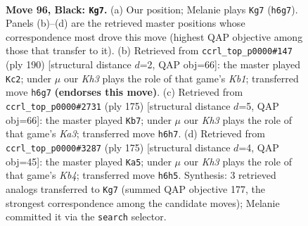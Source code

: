 \documentclass[11pt]{article}
\begin{document}
\clearpage

\begin{figure}[p]\centering
\begin{subfigure}{0.46\textwidth}\centering
\resizebox{\linewidth}{!}{%
\newchessgame
\chessboard[
  setfen={8/8/1R5k/8/8/7K/5p2/3r4 b - - 7 96},
  showmover=false,
  pgfstyle=straightmove, color=movearrow, markmove={h6-g7}
]}
\caption{}
\end{subfigure}\hfill
\begin{subfigure}{0.46\textwidth}\centering
\resizebox{\linewidth}{!}{%
\newchessgame
\chessboard[
  setfen={1k6/8/8/8/8/2R5/8/1K5r w - - 22 96},
  showmover=false,
  pgfstyle=straightmove, color=movearrow, markmove={b1-c2}
]}
\caption{}
\end{subfigure}
\\[4pt]
\begin{subfigure}{0.46\textwidth}\centering
\resizebox{\linewidth}{!}{%
\newchessgame
\chessboard[
  setfen={8/8/k5R1/7p/1K5P/8/8/4r3 b - - 14 88},
  showmover=false,
  pgfstyle=straightmove, color=movearrow, markmove={a6-b7}
]}
\caption{}
\end{subfigure}\hfill
\begin{subfigure}{0.46\textwidth}\centering
\resizebox{\linewidth}{!}{%
\newchessgame
\chessboard[
  setfen={8/8/3r4/1k6/8/4p1K1/4P3/1R6 b - - 19 88},
  showmover=false,
  pgfstyle=straightmove, color=movearrow, markmove={b5-a5}
]}
\caption{}
\end{subfigure}
\caption{\textbf{Move 96, Black: \texttt{Kg7}.} (a) Our position; Melanie plays \texttt{Kg7} (\texttt{h6g7}). Panels (b)--(d) are the retrieved master positions whose correspondence most drove this move (highest QAP objective among those that transfer to it). (b) Retrieved from \texttt{ccrl\_top\_p0000\#147} (ply 190) [structural distance $d$=2, QAP obj=66]: the master played \texttt{Kc2}; under $\mu$ our \emph{Kh3} plays the role of that game's \emph{Kb1}; transferred move \texttt{h6g7} \textbf{(endorses this move)}. (c) Retrieved from \texttt{ccrl\_top\_p0000\#2731} (ply 175) [structural distance $d$=5, QAP obj=66]: the master played \texttt{Kb7}; under $\mu$ our \emph{Kh3} plays the role of that game's \emph{Ka3}; transferred move \texttt{h6h7}. (d) Retrieved from \texttt{ccrl\_top\_p0000\#3287} (ply 175) [structural distance $d$=4, QAP obj=45]: the master played \texttt{Ka5}; under $\mu$ our \emph{Kh3} plays the role of that game's \emph{Kb4}; transferred move \texttt{h6h5}. Synthesis: 3 retrieved analogs transferred to \texttt{Kg7} (summed QAP objective 177, the strongest correspondence among the candidate moves); Melanie committed it via the \texttt{search} selector.}
\label{fig:thought-m191}
\end{figure}
\end{document}

